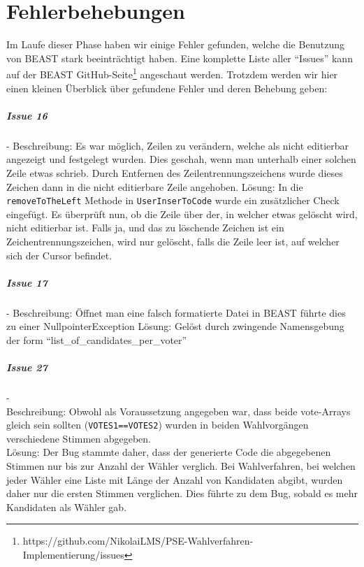 \documentclass[a4paper]{scrreprt}
\begin{document}
\chapter{Fehlerbehebungen}
Im Laufe dieser Phase haben wir einige Fehler gefunden, welche die Benutzung von
BEAST stark beeinträchtigt haben. Eine komplette Liste aller "`Issues"' kann auf
der BEAST
GitHub-Seite\footnote{https://github.com/NikolaiLMS/PSE-Wahlverfahren-Implementierung/issues}
angeschaut werden. Trotzdem werden wir hier einen kleinen Überblick über gefundene Fehler und deren Behebung geben:

\paragraph{Issue 16}- \newline
Beschreibung: Es war möglich, Zeilen zu verändern, welche als nicht editierbar angezeigt und festgelegt wurden. Dies geschah, wenn man unterhalb einer solchen Zeile etwas schrieb. Durch Entfernen des Zeilentrennungszeichens wurde dieses Zeichen dann in die nicht editierbare Zeile angehoben.
\newline
Lösung: In die \verb!removeToTheLeft! Methode in \verb!UserInserToCode! wurde ein zusätzlicher Check eingefügt. Es überprüft nun, ob die Zeile über der, in welcher etwas gelöscht wird, nicht editierbar ist. Falls ja, und das zu löschende Zeichen ist ein Zeichentrennungszeichen, wird nur gelöscht, falls die Zeile leer ist, auf welcher sich der Cursor befindet.

\paragraph{Issue 17}- \newline
Beschreibung: Öffnet man eine falsch formatierte Datei in BEAST führte dies zu
einer NullpointerException
\newline
Lösung: Gelöst durch zwingende Namensgebung der form
"`list_of_candidates_per_voter"' 

\paragraph{Issue 27}- \\
Beschreibung: Obwohl als Voraussetzung angegeben war, dass beide vote-Arrays gleich sein sollten (\verb!VOTES1==VOTES2!) wurden in beiden Wahlvorgängen verschiedene Stimmen abgegeben.\\
Lösung: Der Bug stammte daher, dass der generierte Code die abgegebenen Stimmen nur bis zur Anzahl der Wähler verglich. Bei Wahlverfahren, bei welchen jeder Wähler eine Liste mit Länge der Anzahl von Kandidaten abgibt, wurden daher nur die ersten Stimmen verglichen. Dies führte zu dem Bug, sobald es mehr Kandidaten als Wähler gab.
\end{document}
